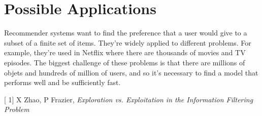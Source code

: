 \documentclass{article}
\renewenvironment{thebibliography}[1]{%
    \begin{oldthebibliography}{#1}%
      \setlength{\parskip}{.3ex}%
      \setlength{\itemsep}{.3ex}%
  }%
  {%
    \end{oldthebibliography}%
  }
\begin{document}
\section{Possible Applications}

Recommender systems want to find the preference that a user would give to a subset of a finite set of items. They're widely applied to different problems. For example, they're used in Netflix where there are thousands of movies and TV episodes. The biggest challenge of these problems is that there are millions of objets and hundreds of million of users, and so it's necessary to find a model that performs well and be sufficiently fast.




\begin{thebibliography}[1]
X Zhao, P Frazier, \emph{Exploration vs. Exploitation in the Information Filtering Problem}
\end{thebibliography}
\end{document}
